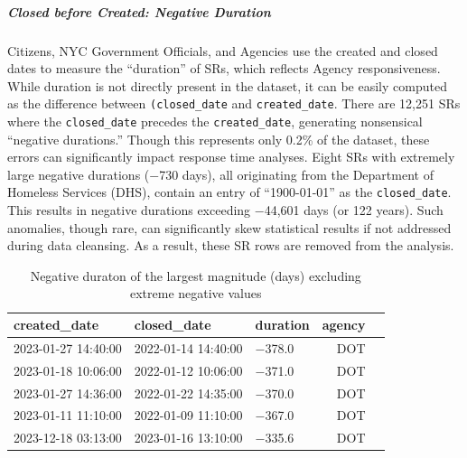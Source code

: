 \documentclass[linenumber]{jdsart}
\begin{document}
\subparagraph{Closed before Created: Negative Duration}
Citizens, NYC Government Officials, and Agencies use the created and 
closed dates to measure the ``duration'' of SRs, which reflects Agency 
responsiveness. While duration is not directly present in the dataset, 
it can be easily computed as the difference between
\texttt{(closed\_date} and \texttt{created\_date}.
There are 12,251 SRs where the \texttt{closed\_date} precedes the 
\texttt{created\_date}, generating nonsensical ``negative durations.'' 
Though this represents only 0.2\% of the dataset, these errors can 
significantly impact response time analyses.
Eight SRs with extremely large negative durations ($-$730 days), all 
originating from the Department of Homeless Services (DHS), contain 
an entry of ``1900-01-01'' as the \texttt{closed\_date}. This results 
in negative durations exceeding $-$44,601 days (or 122 years). Such 
anomalies, though rare, can significantly skew statistical results if 
not addressed during data cleansing. As a result, these SR rows are 
removed from the analysis. 

\begin{table}[tbp]
  \centering
  \caption{Negative duraton of the largest magnitude (days) excluding
    extreme negative values}
  \begin{tabular}{l l l r l}
    \toprule
    {created\_date} & {closed\_date} & {duration} 
    & \textbf{agency} \\
    \midrule
    2023-01-27 14:40:00 & 2022-01-14 14:40:00 & $-$378.0 & DOT \\
    2023-01-18 10:06:00 & 2022-01-12 10:06:00 & $-$371.0 & DOT \\
    2023-01-27 14:36:00 & 2022-01-22 14:35:00 & $-$370.0 & DOT \\
    2023-01-11 11:10:00 & 2022-01-09 11:10:00 & $-$367.0 & DOT \\
    2023-12-18 03:13:00 & 2023-01-16 13:10:00 & $-$335.6 & DOT \\
    \bottomrule
  \end{tabular}
  \label{tab:largest-errors}
\end{table}
\end{document}
